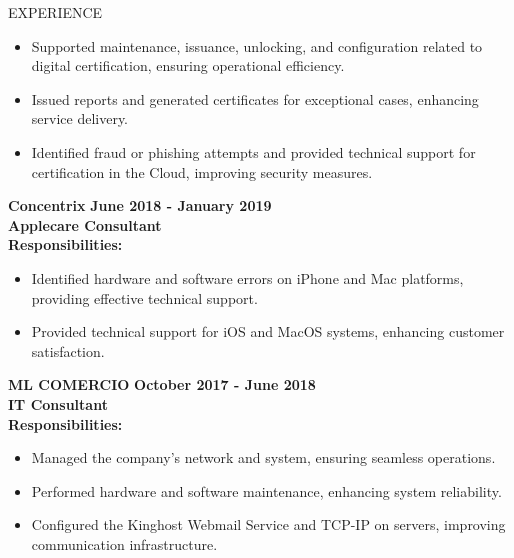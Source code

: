 \documentclass{resume} %
\begin{document}
\begin{rSection}{EXPERIENCE}
\begin{flushleft}
            \begin{itemize}
                                    \item Supported maintenance, issuance, unlocking, and configuration related to digital certification, ensuring operational efficiency.
                                    \item Issued reports and generated certificates for exceptional cases, enhancing service delivery.
                                    \item Identified fraud or phishing attempts and provided technical support for certification in the Cloud, improving security measures.
                            \end{itemize}
            \vspace{0.5em}
            \textbf{Concentrix} \hfill \textbf{June 2018 {-} January 2019} \\
            \textbf{Applecare Consultant} \\
            \vspace{1em}
            \textbf{Responsibilities:} \\
            \begin{itemize}
                                    \item Identified hardware and software errors on iPhone and Mac platforms, providing effective technical support.
                                    \item Provided technical support for iOS and MacOS systems, enhancing customer satisfaction.
                            \end{itemize}
            \vspace{0.5em}
            \textbf{ML COMERCIO} \hfill \textbf{October 2017 {-} June 2018} \\
            \textbf{IT Consultant} \\
            \vspace{1em}
            \textbf{Responsibilities:} \\
            \begin{itemize}
                                    \item Managed the company's network and system, ensuring seamless operations.
                                    \item Performed hardware and software maintenance, enhancing system reliability.
                                    \item Configured the Kinghost Webmail Service and TCP{-}IP on servers, improving communication infrastructure.
                            \end{itemize}
            \vspace{0.5em}
            \end{flushleft} 
\end{rSection}
\end{document}
